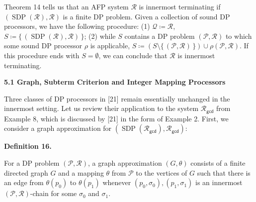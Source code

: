  
 
 
Theorem 14 tells us that an AFP system $\mathcal{R}$ is innermost terminating if $(\operatorname{SDP}(\mathcal{R}),\mathcal{R})$ is a finite DP problem. Given a collection of sound DP processors, we have the following procedure: (1) $\mathcal{Q}\coloneq\mathcal{R}$, $S\coloneq\{\,(\operatorname{SDP}(\mathcal{R}),\mathcal{R})\,\}$; (2) while $S$ contains a DP problem $(\mathcal{P},\mathcal{R})$ to which some sound DP processor $\rho$ is applicable, $S\coloneq(S\setminus\{\,(\mathcal{P},\mathcal{R})\,\})\cup\rho(\mathcal{P},\mathcal{R})$. If this procedure ends with $S=\emptyset$, we can conclude that $\mathcal{R}$ is innermost terminating.\par
 
 
 
\par\medskip\noindent\textbf{5.1 Graph, Subterm Criterion and Integer Mapping Processors}\par
 
 
Three classes of DP processors in [21] remain essentially unchanged in the innermost setting. Let us review their application to the system $\mathcal{R}_{\mathsf{gcd}}$ from Example 8, which is discussed by [21] in the form of Example 2. First, we consider a graph approximation for $(\operatorname{SDP}(\mathcal{R}_{\mathsf{gcd}}),\mathcal{R}_{\mathsf{gcd}})$:\par
 
 
 
\par\medskip\noindent\textbf{Definition 16.}\par
 
 
For a DP problem $(\mathcal{P},\mathcal{R})$, a graph approximation $(G,\theta)$ consists of a finite directed graph $G$ and a mapping $\theta$ from $\mathcal{P}$ to the vertices of $G$ such that there is an edge from $\theta(p_{0})$ to $\theta(p_{1})$ whenever $(p_{0},\sigma_{0}),(p_{1},\sigma_{1})$ is an innermost $(\mathcal{P},\mathcal{R})$-chain for some $\sigma_{0}$ and $\sigma_{1}$.\par
 
 
